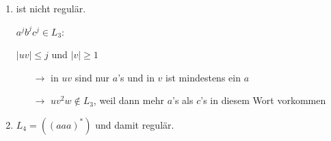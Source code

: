 \documentclass{bschlangaul-aufgabe}
\begin{document}
\begin{enumerate}

\item {}

\begin{bAntwort}
 ist nicht regulär.

$a^j b^j c^j \in L_3$:

$|uv| \leq j$ und $|v| \geq 1$

\begin{itemize}
\item[$\rightarrow$]
in $uv$ sind nur $a$’s und in $v$ ist mindestens ein $a$

\item[$\rightarrow$]
$u v^2 w \notin L_3$, weil dann mehr $a$’s als $c$’s in diesem Wort
vorkommen
\end{itemize}
\end{bAntwort}


\item {}

\begin{bAntwort}
$L_4 = ((aaa)^*)$ und damit regulär.
\end{bAntwort}

\end{enumerate}
\end{document}
